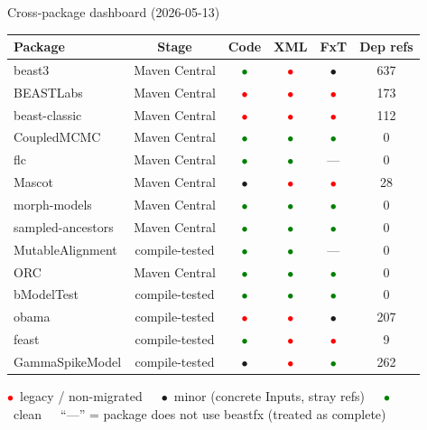 \documentclass[aspectratio=169]{beamer}
\newcommand{\R}{\textcolor{red}{$\bullet$}}
\newcommand{\A}{\textcolor{amber}{$\bullet$}}
\newcommand{\G}{\textcolor{green}{$\bullet$}}
\begin{document}
\begin{frame}{Cross-package dashboard (2026-05-13)}
  \footnotesize
  \begin{tabular}{lccccc}
    \toprule
    Package & Stage & Code & XML & FxT & Dep refs \\
    \midrule
    beast3            & Maven Central & \G & \R & \A & 637 \\
    BEASTLabs         & Maven Central & \R & \R & \R & 173 \\
    beast-classic     & Maven Central & \R & \R & \R & 112 \\
    CoupledMCMC       & Maven Central & \G & \G & \G & 0 \\
    flc               & Maven Central & \G & \G & ---       & 0 \\
    Mascot            & Maven Central & \A & \R & \R & 28 \\
    morph-models      & Maven Central & \G & \G & \G & 0 \\
    sampled-ancestors & Maven Central & \G & \G & \G & 0 \\
    MutableAlignment  & compile-tested & \G & \G & ---      & 0 \\
    ORC               & Maven Central & \G & \G & \G & 0 \\
    bModelTest        & compile-tested & \G & \G & \G & 0 \\
    obama             & compile-tested & \R & \R & \A & 207 \\
    feast             & compile-tested & \G & \R & \R & 9 \\
    GammaSpikeModel   & compile-tested & \A & \R & \G & 262 \\
    \bottomrule
  \end{tabular}
  \vspace{0.4em}

  \scriptsize \R\ legacy / non-migrated~~~\A\ minor (concrete Inputs, stray refs)~~~\G\ clean~~~``---'' = package does not use beastfx (treated as complete)
\end{frame}
\end{document}
